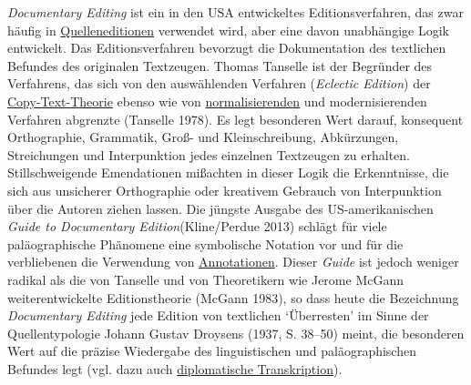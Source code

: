 \documentclass{article}
\begin{document}
    \emph{Documentary Editing} ist ein in den USA entwickeltes
                  Editionsverfahren, das zwar häufig in \href{http://gams.uni-graz.at/o:konde.160}{Quelleneditionen} verwendet wird, aber eine davon unabhängige Logik
                  entwickelt. Das Editionsverfahren bevorzugt die Dokumentation des textlichen
                  Befundes des originalen Textzeugen. Thomas Tanselle ist der Begründer des
                  Verfahrens, das sich von den auswählenden Verfahren (\emph{Eclectic
                     Edition}) der \href{http://gams.uni-graz.at/o:konde.43}{Copy-Text-Theorie} ebenso wie von \href{http://gams.uni-graz.at/o:konde.146}{normalisierenden} und modernisierenden Verfahren
                  abgrenzte (Tanselle 1978). Es legt besonderen Wert darauf, konsequent
                  Orthographie, Grammatik, Groß- und Kleinschreibung, Abkürzungen, Streichungen und
                  Interpunktion jedes einzelnen Textzeugen zu erhalten. Stillschweigende
                  Emendationen mißachten in dieser Logik die Erkenntnisse, die sich aus unsicherer
                  Orthographie oder kreativem Gebrauch von Interpunktion über die Autoren ziehen
                  lassen. Die jüngste Ausgabe des US-amerikanischen \emph{Guide to
                     Documentary Edition}(Kline/Perdue 2013) schlägt für viele paläographische Phänomene eine
                  symbolische Notation vor und für die verbliebenen die Verwendung von \href{http://gams.uni-graz.at/o:konde.17}{Annotationen}. Dieser \emph{Guide} ist jedoch weniger radikal als die von Tanselle und
                  von Theoretikern wie Jerome McGann weiterentwickelte Editionstheorie (McGann
                     1983), so dass heute die Bezeichnung \emph{Documentary
                     Editing} jede Edition von textlichen ‘Überresten’ im Sinne der
                  Quellentypologie Johann Gustav Droysens (1937, S. 38–50) meint, die
                  besonderen Wert auf die präzise Wiedergabe des linguistischen und paläographischen
                  Befundes legt (vgl. dazu auch \href{http://gams.uni-graz.at/o:konde.66}{diplomatische Transkription}).\\
            
\end{document}
